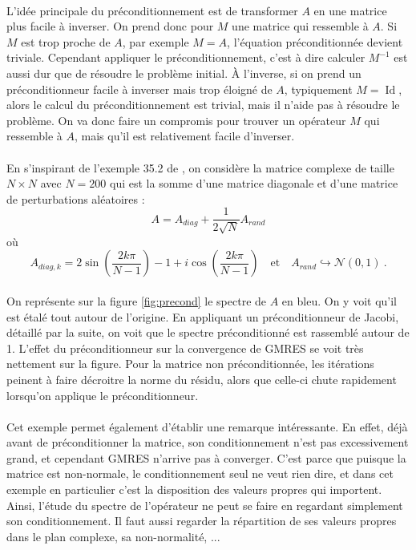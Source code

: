 		\paragraph{}
		L'idée principale du préconditionnement est de transformer $A$ en une matrice plus facile à inverser.
		On prend donc pour $M$ une matrice qui ressemble à $A$.
		Si $M$ est trop proche de $A$, par exemple $M=A$, l'équation préconditionnée devient triviale.
		Cependant appliquer le préconditionnement, c'est à dire calculer $M^{-1}$ est aussi dur que de résoudre le problème initial.
		À l'inverse, si on prend un préconditionneur facile à inverser mais trop éloigné de $A$, typiquement $M = \operatorname{Id}$, alors le calcul du préconditionnement est trivial, mais il n'aide pas à résoudre le problème.
		On va donc faire un compromis pour trouver un opérateur $M$ qui ressemble à $A$, mais qu'il est relativement facile d'inverser.

		\paragraph{}
		En s'inspirant de l'exemple 35.2 de \cite{TrefethenBau1997}, on considère la matrice complexe de taille $N\times N$ avec $N = 200$ qui est la somme d'une matrice diagonale et d'une matrice de perturbations aléatoires :
		\[A = A_{diag} + \frac{1}{2\sqrt{N}}A_{rand}\]
		où
		\[A_{diag, k} = 2\sin\left(\frac{2k\pi}{N-1}\right) - 1 + i\cos\left(\frac{2k\pi}{N-1}\right) \quad\textrm{et}\quad A_{rand}\hookrightarrow\mathcal{N}\left(0,1\right)\ .\]

		\paragraph{}
		On représente sur la figure \ref{fig:precond} le spectre de $A$ en bleu.
		On y voit qu'il est étalé tout autour de l'origine.
		En appliquant un préconditionneur de Jacobi, détaillé par la suite, on voit que le spectre préconditionné est rassemblé autour de 1.
		L'effet du préconditionneur sur la convergence de GMRES se voit très nettement sur la figure.
		Pour la matrice non préconditionnée, les itérations peinent à faire décroitre la norme du résidu, alors que celle-ci chute rapidement lorsqu'on applique le préconditionneur.

		\paragraph{}
		Cet exemple permet également d'établir une remarque intéressante.
		En effet, déjà avant de préconditionner la matrice, son conditionnement n'est pas excessivement grand, et cependant GMRES n'arrive pas à converger.
		C'est parce que puisque la matrice est non-normale, le conditionnement seul ne veut rien dire, et dans cet exemple en particulier c'est la disposition des valeurs propres qui importent.
		Ainsi, l'étude du spectre de l'opérateur ne peut se faire en regardant simplement son conditionnement.
		Il faut aussi regarder la répartition de ses valeurs propres dans le plan complexe, sa non-normalité, ...

